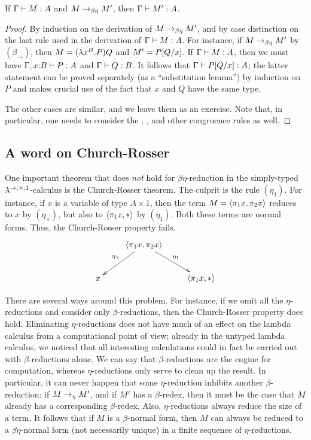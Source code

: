 \documentclass{article}
\begin{document}
\begin{theorem}
  If $\Gamma\vdash M:A$ and $M\rightarrow_{\beta\eta} M'$, then $\Gamma\vdash M':A$. 
\end{theorem}

\begin{proof}
  By induction on the derivation of $M\rightarrow_{\beta\eta} M'$, and by case
  distinction on the last rule used in the derivation of $\Gamma\vdash
  M:A$. For instance, if $M\rightarrow_{\beta\eta} M'$ by $(\beta_{\to})$, then
  $M=(\lambda x^{B}.P)Q$ and $M'=P[Q/x]$. If $\Gamma\vdash M:A$,
  then we must have $\Gamma,x{:}B\vdash P:A$ and $\Gamma\vdash Q:B$.
  It follows that $\Gamma\vdash P[Q/x]:A$; the latter statement
  can be proved separately (as a ``substitution lemma'') by induction
  on $P$ and makes crucial use of the fact that $x$ and $Q$ have the
  same type. 
  
  The other cases are similar, and we leave them as an exercise. Note
  that, in particular, one needs to consider the {},
  {\nrule{\xi}}, and other congruence rules as well. \eot
\end{proof}

\subsection{A word on Church-Rosser}

One important theorem that does {\em not} hold for
$\beta\eta$-reduction in the simply-typed
$\lambda^{\to,\times,1}$-calculus is the Church-Rosser theorem. The
culprit is the rule $(\eta_{1})$. For instance, if $x$ is a variable
of type $A\times 1$, then the term $M=\langle\pi_1 x,\pi_2 x\rangle$
reduces to $x$ by $(\eta_{\times})$, but also to $\langle\pi_1
  x,{*}\rangle$ by $(\eta_{1})$. Both these terms are normal forms.
Thus, the Church-Rosser property fails. 
\[ \xymatrix{&\pair{\proj1 x,\proj2 x}\ar[dl]_{\eta_{\times}}\ar[dr]^{\eta_{1}}
  \\x&&\pair{\proj1 x,\unit}}
\]

There are several ways around this problem.  For instance, if we omit
all the $\eta$-reductions and consider only $\beta$-reductions, then
the Church-Rosser property does hold. Eliminating $\eta$-reductions
does not have much of an effect on the lambda calculus from a
computational point of view; already in the untyped lambda calculus,
we noticed that all interesting calculations could in fact be carried
out with $\beta$-reductions alone. We can say that $\beta$-reductions
are the engine for computation, whereas $\eta$-reductions only serve
to clean up the result. In particular, it can never happen that some
$\eta$-reduction inhibits another $\beta$-reduction: if $M\rightarrow_{\eta} M'$,
and if $M'$ has a $\beta$-redex, then it must be the case that $M$
already has a corresponding $\beta$-redex. Also, $\eta$-reductions
always reduce the size of a term. It follows that if $M$ is a
$\beta$-normal form, then $M$ can always be reduced to a
$\beta\eta$-normal form (not necessarily unique) in a finite sequence
of $\eta$-reductions.
\end{document}
